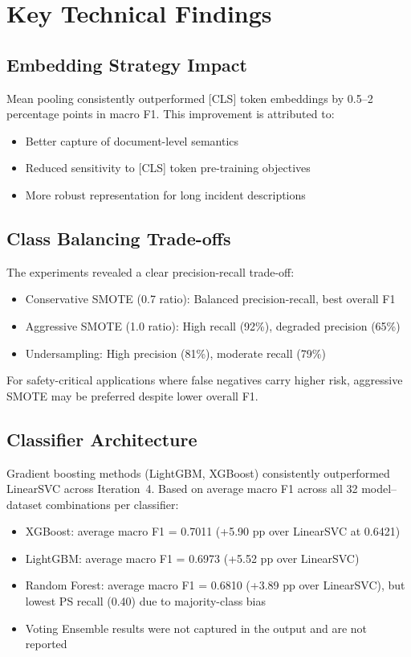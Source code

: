 \documentclass[11pt, titlepage, bibliography=totoc]{scrreprt}
\begin{document}

\section{Key Technical Findings}

\subsection{Embedding Strategy Impact}
Mean pooling consistently outperformed [CLS] token embeddings by 0.5--2 percentage points in macro F1. This improvement is attributed to:
\begin{itemize}
    \item Better capture of document-level semantics
    \item Reduced sensitivity to [CLS] token pre-training objectives
    \item More robust representation for long incident descriptions
\end{itemize}

\subsection{Class Balancing Trade-offs}
The experiments revealed a clear precision-recall trade-off:
\begin{itemize}
    \item Conservative SMOTE (0.7 ratio): Balanced precision-recall, best overall F1
    \item Aggressive SMOTE (1.0 ratio): High recall (92\%), degraded precision (65\%)
    \item Undersampling: High precision (81\%), moderate recall (79\%)
\end{itemize}

For safety-critical applications where false negatives carry higher risk, aggressive SMOTE may be preferred despite lower overall F1.

\subsection{Classifier Architecture}
Gradient boosting methods (LightGBM, XGBoost) consistently outperformed LinearSVC across Iteration~4. Based on average macro F1 across all 32 model--dataset combinations per classifier:
\begin{itemize}
    \item XGBoost: average macro F1 = 0.7011 (+5.90 pp over LinearSVC at 0.6421)
    \item LightGBM: average macro F1 = 0.6973 (+5.52 pp over LinearSVC)
    \item Random Forest: average macro F1 = 0.6810 (+3.89 pp over LinearSVC), but lowest PS recall (0.40) due to majority-class bias
    \item Voting Ensemble results were not captured in the output and are not reported
\end{itemize}
\end{document}
